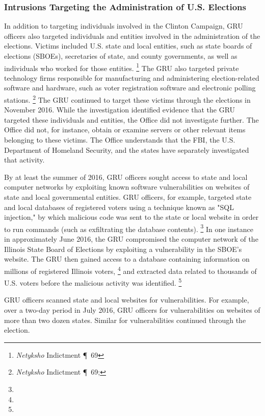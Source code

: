 \subsubsection{Intrusions Targeting the Administration of U.S. Elections}

In addition to targeting individuals involved in the Clinton Campaign, GRU officers also targeted individuals and entities involved in the administration of the elections.
Victims included U.S. state and local entities, such as state boards of elections (SBOEs), secretaries of state, and county governments, as well as individuals who worked for those entities.%
\footnote{\textit{Netyksho} Indictment \P~69}
The GRU also targeted private technology firms responsible for manufacturing and administering election-related software and hardware, such as voter registration software and electronic polling stations.%
\footnote{\textit{Netyksho} Indictment \P~69; }
The GRU continued to target these victims through the elections in November 2016.
While the investigation identified evidence that the GRU targeted these individuals and entities, the Office did not investigate further.
The Office did not, for instance, obtain or examine servers or other relevant items belonging to these victims.
The Office understands that the FBI, the U.S. Department of Homeland Security, and the states have separately investigated that activity.

By at least the summer of 2016, GRU officers sought access to state and local computer networks by exploiting known software vulnerabilities on websites of state and local governmental entities.
GRU officers, for example, targeted state and local databases of registered voters using a technique known as "SQL injection," by which malicious code was sent to the state or local website in order to run commands (such as exfiltrating the database contents).%
\footnote{}
In one instance in approximately June 2016, the GRU compromised the computer network of the Illinois State Board of Elections by exploiting a vulnerability in the SBOE's website.
The GRU then gained access to a database containing information on millions of registered Illinois voters,%
\footnote{}
and extracted data related to thousands of U.S. voters before the malicious activity was identified.%
\footnote{}

GRU officers  scanned state and local websites for vulnerabilities.
For example, over a two-day period in July 2016, GRU officers  for vulnerabilities on websites of more than two dozen states.
Similar  for vulnerabilities continued through the election.

